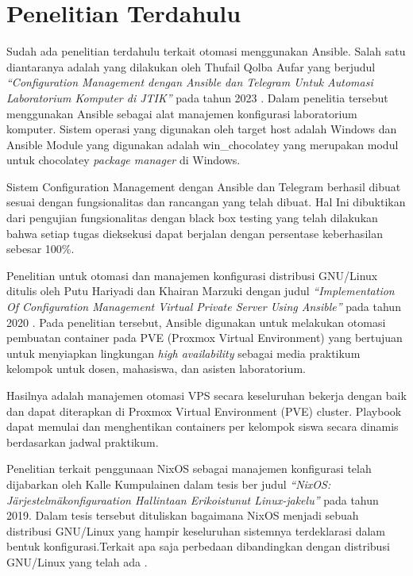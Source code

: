 \documentclass[10pt,]{report}
\begin{document}
\section{Penelitian Terdahulu}
\begin{adjustwidth}{0.70cm}{}
	\vspace{-3mm}
	\hspace\parindent
	Sudah ada penelitian terdahulu terkait otomasi menggunakan Ansible. Salah
	satu diantaranya adalah yang dilakukan oleh Thufail Qolba Aufar yang
	berjudul \textit{“Configuration Management dengan Ansible dan Telegram Untuk
		Automasi Laboratorium Komputer di JTIK”} pada tahun 2023 \parencite{thufail23}. Dalam penelitia
	tersebut menggunakan Ansible sebagai alat manajemen konfigurasi
	laboratorium komputer. Sistem operasi yang digunakan oleh target host
	adalah Windows dan Ansible Module yang digunakan adalah win\_chocolatey yang
	merupakan modul untuk chocolatey \textit{package manager} di Windows.

	Sistem Configuration Management dengan Ansible dan Telegram berhasil dibuat
	sesuai dengan fungsionalitas dan rancangan yang telah dibuat. Hal Ini
	dibuktikan dari pengujian fungsionalitas dengan black box testing yang telah
	dilakukan bahwa setiap tugas dieksekusi dapat berjalan dengan persentase
	keberhasilan sebesar 100\%.

	Penelitian untuk otomasi dan manajemen konfigurasi distribusi GNU/Linux
	ditulis oleh Putu Hariyadi dan Khairan Marzuki dengan judul \textit{“Implementation
		Of Configuration Management Virtual Private Server Using Ansible”} pada
	tahun 2020 \parencite{hariyadi2020}. Pada penelitian tersebut, Ansible digunakan untuk melakukan
	otomasi pembuatan container pada PVE (Proxmox Virtual Environment) yang
	bertujuan untuk menyiapkan lingkungan \textit{high availability} sebagai media
	praktikum kelompok untuk dosen, mahasiswa, dan asisten laboratorium.

	Hasilnya adalah manajemen otomasi VPS secara keseluruhan bekerja dengan baik
	dan dapat diterapkan di Proxmox Virtual Environment (PVE) cluster. Playbook
	dapat memulai dan menghentikan containers per kelompok siswa secara dinamis
	berdasarkan jadwal praktikum.

	Penelitian terkait penggunaan NixOS sebagai manajemen konfigurasi telah
	dijabarkan oleh Kalle Kumpulainen dalam tesis ber judul \textit{“NixOS:
		Järjestelmäkonfiguraation Hallintaan Erikoistunut Linux-jakelu”} pada tahun
	2019. Dalam tesis tersebut dituliskan bagaimana NixOS menjadi sebuah
	distribusi GNU/Linux yang hampir keseluruhan sistemnya terdeklarasi dalam
	bentuk konfigurasi.Terkait apa saja perbedaan dibandingkan dengan
	distribusi GNU/Linux yang telah ada \parencite{kumpulainen_2019_nixos}.


\end{adjustwidth}
\end{document}
